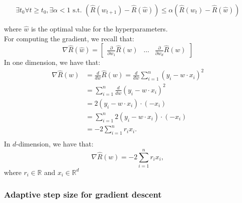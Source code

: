 \documentclass[a4paper,10pt,twoside]{article}
\begin{document}
\begin{equation*}
    \exists t_0 \forall t\geq t_0, \exists \alpha<1 \text{ s.t. } (\hat{R}(w_{t+1})-\hat{R}(\hat{w}))\leq\alpha(\hat{R}(w_{t})-\hat{R}(\hat{w}))
\end{equation*}

where $\hat{w}$ is the optimal value for the hyperparameters.\\
For computing the gradient, we recall that:
\begin{equation*}
    \nabla\hat{R}(\hat{w}) =
    \begin{bmatrix}
        \frac{\partial}{\partial w_1}\hat{R}(w) & \ldots & \frac{\partial}{\partial w_d}\hat{R}(w)
    \end{bmatrix}
\end{equation*}
In one dimension, we have that:
\begin{align*}
    \nabla\hat{R}(w) &= \frac{d}{dw}\hat{R}(w) = \frac{d}{dw}\sum_{i=1}^{n}(y_i-w\cdot x_i)^2\\
    &= \sum_{i=1}^{n}\frac{d}{dw}(y_i-w\cdot x_i)^2\\
    &=2(y_i-w\cdot x_i)\cdot(-x_i)\\
    &=\sum_{i=1}^{n}2(y_i-w\cdot x_i)\cdot(-x_i)\\
    &=-2\sum_{i=1}^{n}r_i x_i.\\
\end{align*}
In $d$-dimension, we have that:
\begin{equation*}
    \nabla\hat{R}(w)=-2\sum_{i=1}^{n}r_i x_i,
\end{equation*}
where $r_i\in\mathbb{R}$ and $x_i\in\mathbb{R}^d$

\subsubsection{Adaptive step size for gradient descent}
\end{document}
